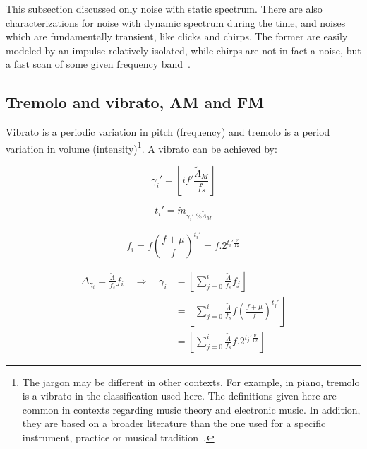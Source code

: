 This subsection discussed only noise with static spectrum. There are also characterizations for noise with dynamic spectrum during the time, and noises which are fundamentally transient, like clicks and chirps. The former are easily modeled by an impulse relatively isolated, while chirps are not in fact a noise, but a fast scan of some given frequency band~\cite{Cook}.

\subsection{Tremolo and vibrato, AM and FM}\label{subsec:tvaf}
Vibrato is a periodic variation in pitch (frequency) and tremolo is a period variation in volume (intensity)\footnote{The jargon may be different in other contexts. For example, in piano, tremolo is a vibrato in the classification used here. The definitions given here are common in contexts regarding music theory and electronic music. In addition, they are based on a broader literature than the one used for a specific instrument, practice or musical tradition~\cite{Lacerda,Harmonia}.}.
A vibrato can be achieved by:

\begin{equation}\label{vbrGamma}
 \gamma_i'=\left \lfloor i f' \frac{\widetilde{\Lambda}_M}{f_s} \right \rfloor
\end{equation}

\begin{equation}\label{vbrAux}
 t_i'=\widetilde{m}_{\gamma_i' \;\% \widetilde{\Lambda}_M}
\end{equation}

\begin{equation}\label{vbrF}
 f_i=f \left ( \frac{f + \mu }{f} \right )^{t_i'}=f . 2^{t_i'\frac{\nu}{12}}
\end{equation}

\begin{equation}\label{vbrGamma2}
\begin{split}
	\Delta_{\gamma_i}=\frac{\widetilde{\Lambda}}{f_s}f_i \quad \Rightarrow \quad \gamma_i & = \left \lfloor \sum_{j=0}^{i} \frac{\widetilde{\Lambda}}{f_s}f_j \right \rfloor \\ 
	& = \left \lfloor \sum_{j=0}^{i} \frac{\widetilde{\Lambda}}{f_s}f \left ( \frac{f + \mu }{f} \right )^{t_j'}  \right \rfloor \\
	& = \left \lfloor \sum_{j=0}^{i} \frac{\widetilde{\Lambda}}{f_s}f . 2^{t_j'\frac{\nu}{12}}  \right \rfloor
\end{split}
\end{equation}

